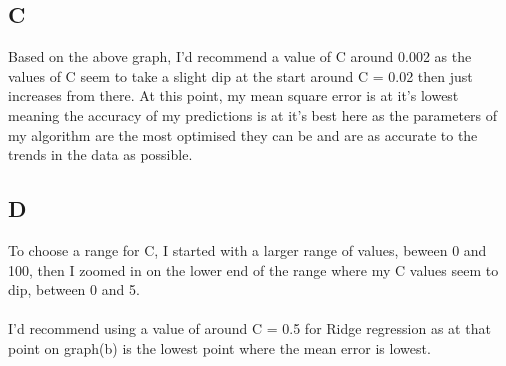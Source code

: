 \documentclass[11pt]{article} %
\begin{document}
\subsection{C}
Based on the above graph, I'd recommend a value of C around 0.002 as the values of C seem to take a slight dip at the start around C = 0.02 then just increases from there. At this point, my mean square error is at it's lowest meaning the accuracy of my predictions is at it's best here as the parameters of my algorithm are the most optimised they can be and are as accurate to the trends in the data as possible.
\subsection{D}
\begin{figure}[h]
\qquad
{}
\end{figure}
To choose a range for C, I started with a larger range of values, beween 0 and 100, then I zoomed in on the lower end of the range where my C values seem to dip, between 0 and 5.\\\\ I'd recommend using a value of around C = 0.5 for Ridge regression as at that point on graph(b) is the lowest point where the mean error is lowest. 
\end{document}
